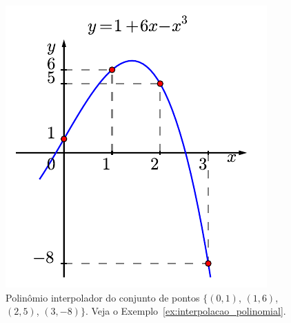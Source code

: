 \begin{figure}[ht]
  \centering
  \includegraphics{./cap_interp/pics/ex_interpolacao_polinomial/ex_interpolacao_polinomial}
  \caption{Polinômio interpolador do conjunto de pontos $\{(0, 1)$, $(1, 6)$, $(2, 5)$, $(3, -8)\}$. Veja o Exemplo~\ref{ex:interpolacao_polinomial}.}\label{fig:ex_interpolacao_polinomial}
\end{figure}

